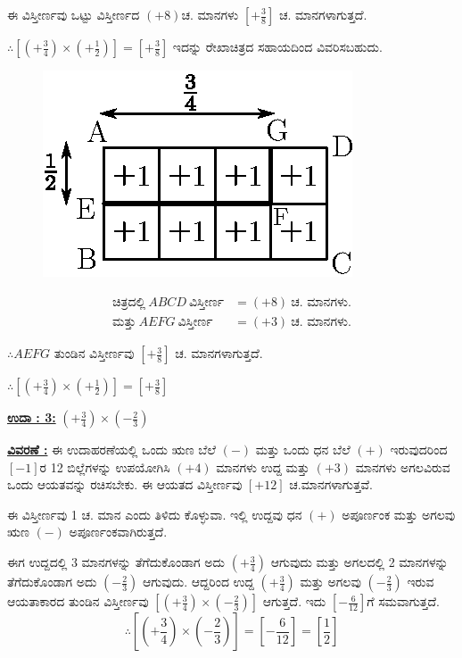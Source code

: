 ಈ ವಿಸ್ತೀರ್ಣವು ಒಟ್ಟು ವಿಸ್ತೀರ್ಣದ $(+8)$ಚ. ಮಾನಗಳು $\left[+\frac{3}{8}\right]$ ಚ. ಮಾನಗಳಾಗುತ್ತದೆ.
  
$\therefore \left[\left(+\frac{3}{4}\right) \times \left(+\frac{1}{2}\right) \right] = \left[+\frac{3}{8}\right]$ ಇದನ್ನು ರೇಖಾಚಿತ್ರದ ಸಹಾಯದಿಂದ ವಿವರಿಸ\-ಬಹುದು. 
\begin{figure}[H]
\centering
\includegraphics[scale=0.8]{src/figure/chap3/fig3-24b.eps}
\end{figure}
\vskip -1.2cm
\begin{align*}
\text{ಚಿತ್ರದಲ್ಲಿ}~ ABCD~ \text{ವಿಸ್ತೀರ್ಣ} & = (+8)~ \text{ಚ. ಮಾನಗಳು.}\\
\text{ಮತ್ತು}~ AEFG~ \text{ವಿಸ್ತೀರ್ಣ} & = (+3)~ \text{ಚ. ಮಾನಗಳು.}
\end{align*}

$\therefore AEFG$ ತುಂಡಿನ ವಿಸ್ತೀರ್ಣವು $\left[+\frac{3}{8}\right]$ ಚ. ಮಾನಗಳಾಗುತ್ತದೆ. 

$\therefore \left[\left(+\frac{3}{4}\right) \times \left(+\frac{1}{2}\right)\right] = \left[+\frac{3}{8}\right]$


\noindent
{\textbf{\underline{ಉದಾ : 3:}}} $\left(+\frac{3}{4} \right) \times \left(-\frac{2}{3} \right)$

\noindent
{\textbf{\underline{ವಿವರಣೆ :}}} ಈ ಉದಾಹರಣೆಯಲ್ಲಿ ಒಂದು ಋಣ ಬೆಲೆ $(-)$ ಮತ್ತು ಒಂದು ಧನ ಬೆಲೆ $(+)$ ಇರುವುದರಿಂದ $[-1]$ರ 12 ಬಿಲ್ಲೆಗಳನ್ನು ಉಪಯೋಗಿಸಿ $(+4)$ ಮಾನಗಳು ಉದ್ದ ಮತ್ತು $(+3)$ ಮಾನಗಳು ಅಗಲವಿರುವ ಒಂದು ಆಯತವನ್ನು ರಚಿಸಬೇಕು. ಈ ಆಯತದ \hbox{ವಿಸ್ತೀರ್ಣವು} $[+12]$ ಚ.ಮಾನಗಳಾಗುತ್ತವೆ.

ಈ ವಿಸ್ತೀರ್ಣವು 1 ಚ. ಮಾನ ಎಂದು ತಿಳಿದು ಕೊಳ್ಳುವಾ. ಇಲ್ಲಿ ಉದ್ದವು ಧನ $(+)$ ಅಪೂರ್ಣಂಕ ಮತ್ತು ಅಗಲವು ಋಣ $(-)$ ಅಪೂರ್ಣಂಕವಾಗಿರುತ್ತದೆ.

ಈಗ ಉದ್ದದಲ್ಲಿ 3 ಮಾನಗಳನ್ನು ತೆಗೆದುಕೊಂಡಾಗ ಅದು $\left(+\frac{3}{4} \right)$ ಆಗುವುದು ಮತ್ತು ಅಗಲದಲ್ಲಿ 2 ಮಾನಗಳನ್ನು ತೆಗೆದುಕೊಂಡಾಗ ಅದು $\left(-\frac{2}{3} \right)$ ಆಗುವುದು. ಆದ್ದರಿಂದ ಉದ್ದ $\left(+\frac{3}{4} \right)$ ಮತ್ತು ಅಗಲವು $\left(-\frac{2}{3} \right)$ ಇರುವ ಆಯತಾಕಾರದ ತುಂಡಿನ ವಿಸ್ತೀರ್ಣವು $\left[\left(+\frac{3}{4} \right) \times \left(-\frac{2}{3} \right)\right]$ ಆಗುತ್ತದೆ. ಇದು $\left[-\frac{6}{12}\right]$ಗೆ ಸಮವಾಗುತ್ತದೆ.
$$
\therefore \left[\left(+\frac{3}{4}\right) \times \left(-\frac{2}{3}\right)\right] = \left[-\frac{6}{12}\right] = \left[\frac{1}{2} \right]
$$

